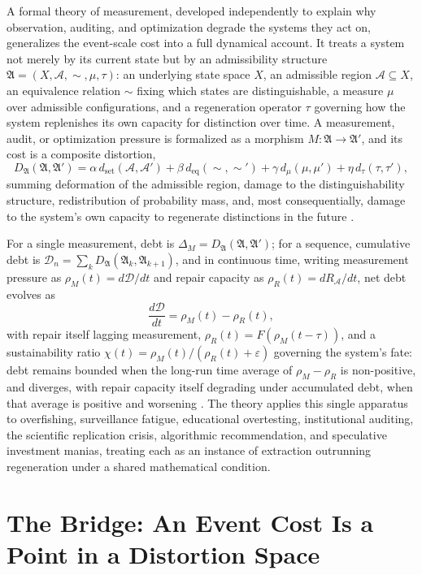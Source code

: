 \documentclass[11pt]{article}
\theoremstyle{plain}
\begin{document}
A formal theory of measurement, developed independently to explain why observation, auditing, and optimization degrade the systems they act on, generalizes the event-scale cost into a full dynamical account. It treats a system not merely by its current state but by an admissibility structure $\mathfrak{A} = (X, \mathcal{A}, {\sim}, \mu, \tau)$: an underlying state space $X$, an admissible region $\mathcal{A} \subseteq X$, an equivalence relation ${\sim}$ fixing which states are distinguishable, a measure $\mu$ over admissible configurations, and a regeneration operator $\tau$ governing how the system replenishes its own capacity for distinction over time. A measurement, audit, or optimization pressure is formalized as a morphism $M: \mathfrak{A} \to \mathfrak{A}'$, and its cost is a composite distortion,
\[
D_{\mathfrak{A}}(\mathfrak{A}, \mathfrak{A}') = \alpha\, d_{\mathrm{set}}(\mathcal{A}, \mathcal{A}') + \beta\, d_{\mathrm{eq}}({\sim}, {\sim}') + \gamma\, d_\mu(\mu, \mu') + \eta\, d_\tau(\tau, \tau'),
\]
summing deformation of the admissible region, damage to the distinguishability structure, redistribution of probability mass, and, most consequentially, damage to the system's own capacity to regenerate distinctions in the future \citep{costofknowing}.

For a single measurement, debt is $\Delta_M = D_{\mathfrak{A}}(\mathfrak{A}, \mathfrak{A}')$; for a sequence, cumulative debt is $\mathcal{D}_n = \sum_{k} D_{\mathfrak{A}}(\mathfrak{A}_k, \mathfrak{A}_{k+1})$, and in continuous time, writing measurement pressure as $\rho_M(t) = d\mathcal{D}/dt$ and repair capacity as $\rho_R(t) = d R_{\mathcal{A}}/dt$, net debt evolves as
\[
\frac{d\mathcal{D}}{dt} = \rho_M(t) - \rho_R(t),
\]
with repair itself lagging measurement, $\rho_R(t) = F(\rho_M(t-\tau))$, and a sustainability ratio $\chi(t) = \rho_M(t) / (\rho_R(t) + \varepsilon)$ governing the system's fate: debt remains bounded when the long-run time average of $\rho_M - \rho_R$ is non-positive, and diverges, with repair capacity itself degrading under accumulated debt, when that average is positive and worsening \citep{costofknowing}. The theory applies this single apparatus to overfishing, surveillance fatigue, educational overtesting, institutional auditing, the scientific replication crisis, algorithmic recommendation, and speculative investment manias, treating each as an instance of extraction outrunning regeneration under a shared mathematical condition.

\section{The Bridge: An Event Cost Is a Point in a Distortion Space}
\label{sec:bridge}
\end{document}
